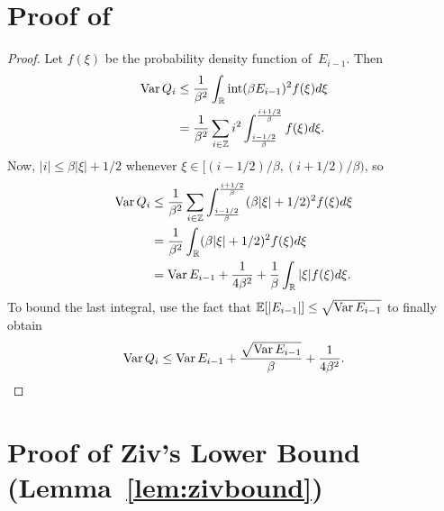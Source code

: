 \begin{subappendices}


\section{Proof of }\label{app:qvarboundproof}

\begin{proof}
  Let $f(\xi)$ be the probability density function of~$E_{i-1}$. Then
  \begin{align*}
    \operatorname{Var} Q_i &\le \frac{1}{\beta^2} \int_{\mathbb{R}} \operatorname{int}(\beta E_{i-1})^2 f(\xi) d\xi
    \\
    &= \frac{1}{\beta^2} \sum_{i\in\mathbb{Z}} i^2
    \int_{\frac{i-1/2}{\beta}}^{\frac{i+1/2}{\beta}} f(\xi) d\xi.
  \end{align*}
  Now, $|i| \le \beta|\xi| + 1/2$ whenever $\xi \in [(i-1/2)/\beta,
  (i+1/2)/\beta)$, so
  \begin{align*}
    \operatorname{Var} Q_i &\le \frac{1}{\beta^2} \sum_{i\in \mathbb{Z}}
    \int_{\frac{i-1/2}{\beta}}^{\frac{i+1/2}{\beta}} (\beta|\xi| + 1/2)^2 
    f(\xi) d\xi \\
    &= \frac{1}{\beta^2} \int_{\mathbb{R}} (\beta|\xi| + 1/2)^2 f(\xi) d\xi \\
    &= \operatorname{Var} E_{i-1} + \frac{1}{4\beta^2} + \frac{1}{\beta} \int_{\mathbb{R}} |\xi|
    f(\xi)d\xi.
  \end{align*}
  To bound the last integral, use the fact that $\mathbb{E}[|E_{i-1}|] \le \sqrt{\operatorname{Var}
  E_{i-1}}$ to finally obtain
  \begin{equation*}
    \operatorname{Var} Q_i \le \operatorname{Var} E_{i-1} + \frac{\sqrt{\operatorname{Var} E_{i-1}}}{\beta} +
    \frac{1}{4\beta^2}.
  \end{equation*}
\end{proof}
  

  \section{Proof of Ziv's Lower Bound (Lemma~\ref{lem:zivbound})}
  \label{app:zivboundproof}


\end{subappendices}
